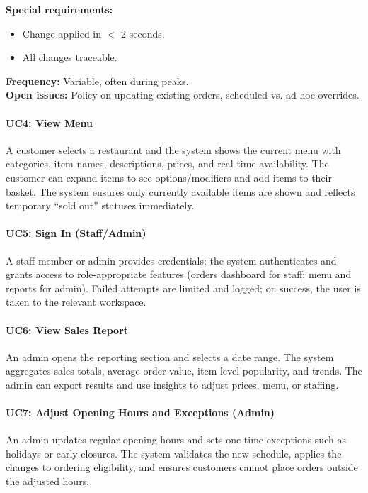 \documentclass{article}
\begin{document}
\textbf{Special requirements:}
\begin{itemize}
    \item Change applied in $<$ 2 seconds.
    \item All changes traceable.
\end{itemize}

\textbf{Frequency:} Variable, often during peaks.\\
\textbf{Open issues:} Policy on updating existing orders, scheduled vs. ad-hoc overrides.

\newpage

\paragraph{UC4: View Menu}  
A customer selects a restaurant and the system shows the current menu with categories, item names, descriptions, prices, and real-time availability. The customer can expand items to see options/modifiers and add items to their basket. The system ensures only currently available items are shown and reflects temporary “sold out” statuses immediately.

\paragraph{UC5: Sign In (Staff/Admin)}  
A staff member or admin provides credentials; the system authenticates and grants access to role-appropriate features (orders dashboard for staff; menu and reports for admin). Failed attempts are limited and logged; on success, the user is taken to the relevant workspace.

\paragraph{UC6: View Sales Report}  
An admin opens the reporting section and selects a date range. The system aggregates sales totals, average order value, item-level popularity, and trends. The admin can export results and use insights to adjust prices, menu, or staffing.

\paragraph{UC7: Adjust Opening Hours and Exceptions (Admin)}  
An admin updates regular opening hours and sets one-time exceptions such as holidays or early closures. The system validates the new schedule, applies the changes to ordering eligibility, and ensures customers cannot place orders outside the adjusted hours.
\end{document}
